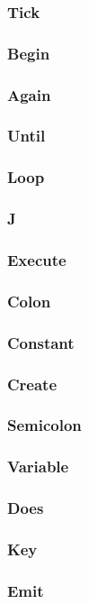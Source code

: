 \subsubsection{Tick}
\subsubsection{Begin}
\subsubsection{Again}
\subsubsection{Until}
\subsubsection{Loop}
\subsubsection{J}
\subsubsection{Execute}
\subsubsection{Colon}
\subsubsection{Constant}
\subsubsection{Create}
\subsubsection{Semicolon}
\subsubsection{Variable}
\subsubsection{Does}
\subsubsection{Key}
\subsubsection{Emit}
